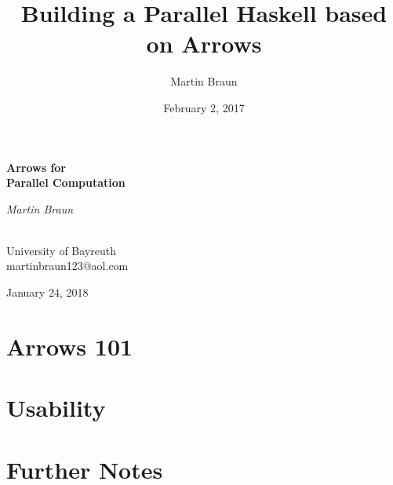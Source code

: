 \documentclass{beamer}
\title{Building a Parallel Haskell based on Arrows}
\author{Martin Braun}
\date{February 2, 2017}
\begin{document}
	\begin{frame}[fragile]
		\centering
		\vspace{0.75cm}
		{\huge\bfseries Arrows for\\Parallel Computation\par}
		\vspace{0.5cm}
		{\Large\itshape Martin Braun\par}
		~\\
		University of Bayreuth\\
		martinbraun123@aol.com
		\vspace{0.5cm}
		
		\vfill
		
		{\large January 24, 2018\par}
	\end{frame}
	\begin{frame}
		\tableofcontents
	\end{frame}
	\section{Arrows 101}
	
	
	
	
	\section{Usability}
	
	
	
	
	\AtBeginSection{}
	
	\section{Further Notes}
	
	
	\appendix
	
	
\end{document}
